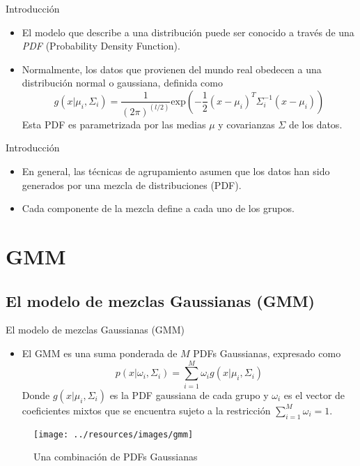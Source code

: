 \documentclass[xcolor=x11names,compress]{beamer}
\renewcommand{\(}{\begin{columns}}
\renewcommand{\)}{\end{columns}}
\newcommand{\<}[1]{\begin{column}{#1}}
\renewcommand{\>}{\end{column}}
\begin{document}
\begin{frame}{Introducción}
\begin{itemize}
 	\item El modelo que describe a una distribución puede ser conocido a través de una \emph{PDF} (Probability Density Function).
 	\item Normalmente, los datos que provienen del mundo real obedecen a una distribución normal o gaussiana, definida como
\begin{equation}
 g(x|\mu _i,\Sigma_i)  = \frac{1}{(2 \pi)^{(l/2)}}\text{exp} \left(  -\frac{1}{2}(x-\mu _i)^T \Sigma _i^{-1} (x-\mu _i) \right)
\end{equation}
 Esta PDF es parametrizada por las medias $\mu$ y covarianzas $\Sigma$ de los datos.
\end{itemize}    
\end{frame}


\begin{frame}{Introducción}
\begin{itemize}
	\item En general, las técnicas de agrupamiento asumen que los datos han sido generados por una mezcla de distribuciones (PDF).
	\item Cada componente de la mezcla define a cada uno de los grupos.
\end{itemize}
\end{frame}

\section{\scshape GMM}
\subsection{El modelo de mezclas Gaussianas (GMM)}
\begin{frame}{El modelo de mezclas Gaussianas (GMM)}
   
   	\begin{itemize}
   		\item El GMM es una suma ponderada de $M$ PDFs Gaussianas, expresado como
   		\begin{equation}
p(x|\omega _i,\Sigma _i) = \sum_{i=1}^{M}\omega _ig(x|\mu _i,\Sigma_i)
\end{equation}
Donde $g(x|\mu _i,\Sigma_i)$ es la PDF gaussiana de cada grupo y $\omega _i$ es el vector de coeficientes mixtos que se encuentra sujeto a la restricción $\sum_{i=1}^{M}\omega _i = 1$.
   	\end{itemize}

\begin{figure}
	\centering
	\texttt{[image: ../resources/images/gmm]}
	\caption{Una combinación de PDFs Gaussianas}
	\label{fig:figure1}
\end{figure}
\end{frame}
\end{document}

